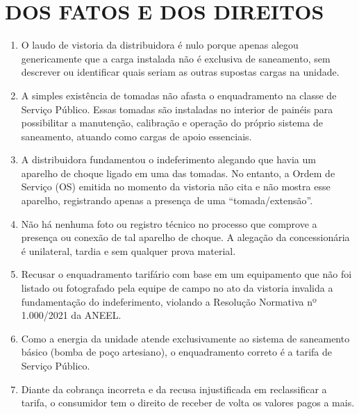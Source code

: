 \newcommand{\tipoRequerimento}{cobrança indevida sobre enquadramento tarifário incorreto}
\section{DOS FATOS E DOS DIREITOS}

\begin{enumerate}[resume]
    \item O laudo de vistoria da distribuidora é nulo porque apenas alegou genericamente que a carga instalada não é exclusiva de saneamento, sem descrever ou identificar quais seriam as outras supostas cargas na unidade.
    
    \item A simples existência de tomadas não afasta o enquadramento na classe de Serviço Público. Essas tomadas são instaladas no interior de painéis para possibilitar a manutenção, calibração e operação do próprio sistema de saneamento, atuando como cargas de apoio essenciais.
    
    \item A distribuidora fundamentou o indeferimento alegando que havia um aparelho de choque ligado em uma das tomadas. No entanto, a Ordem de Serviço (OS) emitida no momento da vistoria não cita e não mostra esse aparelho, registrando apenas a presença de uma ``tomada/extensão''.
    
    \item Não há nenhuma foto ou registro técnico no processo que comprove a presença ou conexão de tal aparelho de choque. A alegação da concessionária é unilateral, tardia e sem qualquer prova material.
    
    \item Recusar o enquadramento tarifário com base em um equipamento que não foi listado ou fotografado pela equipe de campo no ato da vistoria invalida a fundamentação do indeferimento, violando a Resolução Normativa nº 1.000/2021 da ANEEL.
    
    \item Como a energia da unidade atende exclusivamente ao sistema de saneamento básico (bomba de poço artesiano), o enquadramento correto é a tarifa de Serviço Público.
    
    \item Diante da cobrança incorreta e da recusa injustificada em reclassificar a tarifa, o consumidor tem o direito de receber de volta os valores pagos a mais.
\end{enumerate}

